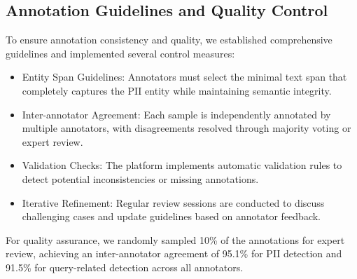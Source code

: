 \subsection{Annotation Guidelines and Quality Control}
To ensure annotation consistency and quality, we established comprehensive guidelines and implemented several control measures:
\begin{itemize}
\item Entity Span Guidelines: Annotators must select the minimal text span that completely captures the PII entity while maintaining semantic integrity.
\item Inter-annotator Agreement: Each sample is independently annotated by multiple annotators, with disagreements resolved through majority voting or expert review.
\item Validation Checks: The platform implements automatic validation rules to detect potential inconsistencies or missing annotations.
\item Iterative Refinement: Regular review sessions are conducted to discuss challenging cases and update guidelines based on annotator feedback.
\end{itemize}
For quality assurance, we randomly sampled 10\% of the annotations for expert review, achieving an inter-annotator agreement of 95.1\% for PII detection and 91.5\% for query-related detection across all annotators.

